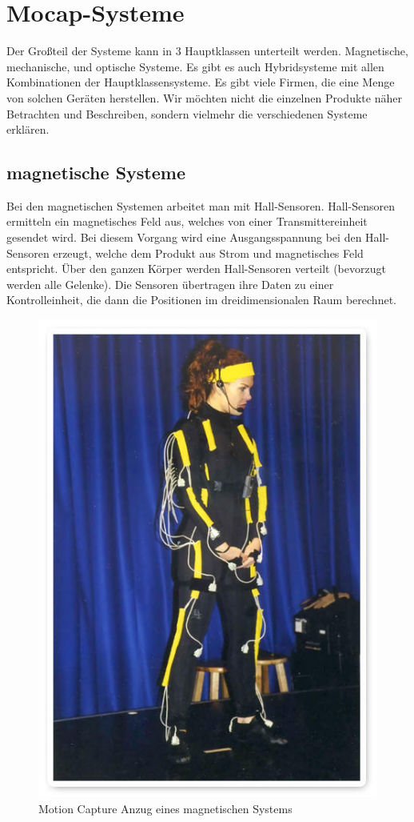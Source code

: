 \chapter{Mocap-Systeme}

Der Großteil der Systeme kann in 3 Hauptklassen unterteilt werden. Magnetische, mechanische,
und optische Systeme. Es gibt es auch Hybridsysteme mit allen  
Kombinationen der Hauptklassensysteme. Es gibt viele Firmen, die eine Menge von solchen Geräten 
herstellen. Wir möchten nicht die einzelnen Produkte näher Betrachten und Beschreiben, sondern vielmehr die 
verschiedenen Systeme erklären.

\section{magnetische Systeme}

Bei den magnetischen Systemen arbeitet man mit Hall-Sensoren. Hall-Sensoren ermitteln ein magnetisches Feld aus, welches von einer Transmittereinheit gesendet wird. Bei diesem  Vorgang wird eine Ausgangsspannung bei den Hall-Sensoren erzeugt, welche dem Produkt aus Strom und magnetisches Feld entspricht. Über den ganzen Körper werden Hall-Sensoren verteilt (bevorzugt werden alle Gelenke). Die 
Sensoren übertragen ihre Daten zu einer Kontrolleinheit, die dann die Positionen im dreidimensionalen Raum berechnet.

\begin{figure}[htbp]
\centering
\includegraphics[scale=1]{include/magneticgirl.jpg}
\caption{Motion Capture Anzug eines magnetischen  Systems}
\end{figure}

